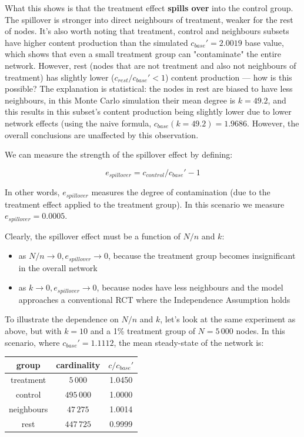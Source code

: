 \documentclass[final,5p,times,twocolumn,authoryear]{elsarticle}
\begin{document}
What this shows is that the treatment effect \textbf{spills over} into the control group. The spillover is stronger into direct neighbours of treatment, weaker for the rest of nodes. It's also worth noting that treatment, control and neighbours subsets have higher content production than the simulated $c_{base}\prime=2.0019$ base value, which shows that even a small treatment group can "contaminate" the entire network. However, rest (nodes that are not treatment and also not neighbours of treatment) has slightly lower ($c_{rest}/c_{base}\prime < 1$) content production --- how is this possible? The explanation is statistical: the nodes in rest are biased to have less neighbours, in this Monte Carlo simulation their mean degree is $k=49.2$, and this results in this subset's content production being slightly lower due to lower network effects (using the naive formula, $c_{base}(k=49.2)=1.9686$. However, the overall conclusions are unaffected by this observation.

We can measure the strength of the spillover effect by defining:

\begin{equation}
e_{spillover} = c_{control} / c_{base}\prime  - 1
\end{equation}

In other words, $e_{spillover}$ measures the degree of contamination (due to the treatment effect applied to the treatment group). In this scenario we measure $e_{spillover} = 0.0005$.

Clearly, the spillover effect must be a function of $N/n$ and $k$:

\begin{itemize}
\setlength\itemsep{0em}
    \item as $N/n \rightarrow 0, e_{spillover} \rightarrow 0$, because the treatment group becomes insignificant in the overall network
    \item as $k \rightarrow 0, e_{spillover} \rightarrow 0$, because nodes have less neighbours and the model approaches a conventional RCT where the Independence Assumption holds
\end{itemize}

To illustrate the dependence on $N/n$ and $k$, let's look at the same experiment as above, but with $k=10$ and a 1\% treatment group of $N=5\,000$ nodes. In this scenario, where $c_{base}\prime=1.1112$, the mean steady-state of the network is:

\begin{center}
\begin{tabular}{ |c|c|c| } 
 \hline
 \textbf{group} & \textbf{cardinality} & $c / c_{base}\prime$ \\ 
 \hline
 treatment   &  $5\,000$    &  1.0450 \\ 
 control     &  $495\,000$  &  1.0000 \\ 
 neighbours  &  $47\,275$   &  1.0014 \\ 
 rest        &  $447\,725$  &  0.9999 \\ 
 \hline
\end{tabular}
\end{center}
\end{document}
